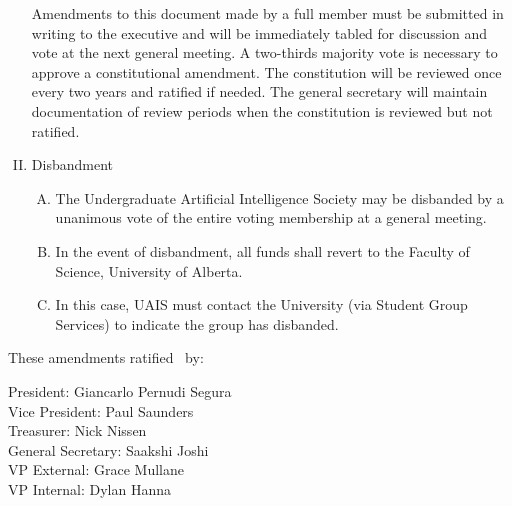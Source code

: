 \documentclass[11pt]{article}
\begin{document}
\begin{enumerate}[I.]
    Amendments to this document made by a full member must be submitted in
    writing to the executive and will be immediately tabled for discussion and vote at the next general meeting. A two-thirds majority vote is necessary to approve a constitutional amendment. The constitution will be reviewed once every two years and ratified if needed. The general secretary will maintain documentation of review periods when the constitution is reviewed but not ratified.
  \item Disbandment
    \begin{enumerate}[A)]
      \item The Undergraduate Artificial Intelligence Society may be disbanded by a unanimous vote of the entire voting membership at a general meeting.
      \item  In the event of disbandment, all funds shall revert to the Faculty of Science, University of Alberta.
      \item In this case, UAIS must contact the University (via Student Group Services) to indicate the group has disbanded.
    \end{enumerate}
\end{enumerate}

These amendments ratified \thedate\ by:

President: Giancarlo Pernudi Segura \\
Vice President: Paul Saunders \\
Treasurer: Nick Nissen \\
General Secretary: Saakshi Joshi \\
VP External: Grace Mullane \\
VP Internal: Dylan Hanna \\
\end{document}
